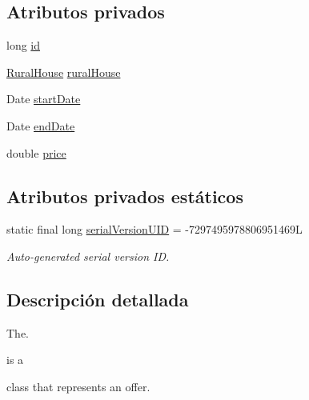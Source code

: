 \subsection*{Atributos privados}
\begin{DoxyCompactItemize}
\item 
long \mbox{\hyperlink{classcom_1_1ruralhousejsf_1_1domain_1_1_offer_aba6516f5b9bb2dbe5d8b99404335adfc}{id}}
\item 
\mbox{\hyperlink{classcom_1_1ruralhousejsf_1_1domain_1_1_rural_house}{Rural\+House}} \mbox{\hyperlink{classcom_1_1ruralhousejsf_1_1domain_1_1_offer_a87036858904c59c964d2c75137a97323}{rural\+House}}
\item 
Date \mbox{\hyperlink{classcom_1_1ruralhousejsf_1_1domain_1_1_offer_a3c4e8f6eb72413f6f76b1e4b05404ea8}{start\+Date}}
\item 
Date \mbox{\hyperlink{classcom_1_1ruralhousejsf_1_1domain_1_1_offer_a315f9b97f02da79a97fa489db212b5ce}{end\+Date}}
\item 
double \mbox{\hyperlink{classcom_1_1ruralhousejsf_1_1domain_1_1_offer_a2106c38f0c490e3263b1364c3ac56b0a}{price}}
\end{DoxyCompactItemize}
\subsection*{Atributos privados estáticos}
\begin{DoxyCompactItemize}
\item 
static final long \mbox{\hyperlink{classcom_1_1ruralhousejsf_1_1domain_1_1_offer_a4516c2ff68502d92f1405b8478e9fe6f}{serial\+Version\+U\+ID}} = -\/7297495978806951469L
\begin{DoxyCompactList}\small\item\em Auto-\/generated serial version ID. \end{DoxyCompactList}\end{DoxyCompactItemize}


\subsection{Descripción detallada}
The. 


\begin{DoxyCode}{0}
\end{DoxyCode}
 is a
\begin{DoxyCode}{0}
\end{DoxyCode}
 class that represents an offer.

